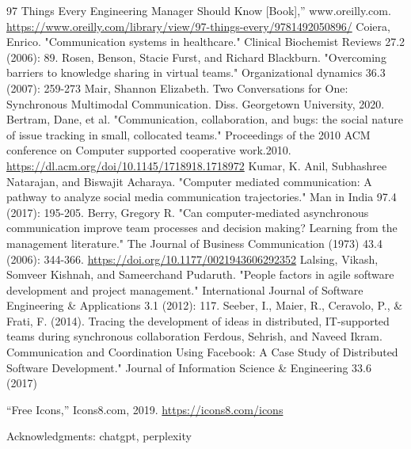 \documentclass[runningheads]{llncs}
\begin{document}
    \begin{thebibliography}{8}
    97 Things Every Engineering Manager Should Know [Book],” www.oreilly.com.
    \url{https://www.oreilly.com/library/view/97-things-every/9781492050896/}
    ‌
    Coiera, Enrico. "Communication systems in healthcare." Clinical Biochemist Reviews 27.2 (2006): 89.
    Rosen, Benson, Stacie Furst, and Richard Blackburn. "Overcoming barriers to knowledge sharing in virtual teams." Organizational dynamics 36.3 (2007): 259-273
    Mair, Shannon Elizabeth. Two Conversations for One: Synchronous Multimodal Communication. Diss. Georgetown University, 2020.
    Bertram, Dane, et al. "Communication, collaboration, and bugs: the social nature of issue tracking in small, collocated teams." Proceedings of the 2010 ACM conference on Computer supported cooperative work.2010. \url{https://dl.acm.org/doi/10.1145/1718918.1718972}
    Kumar, K. Anil, Subhashree Natarajan, and Biswajit Acharaya. "Computer mediated communication: A pathway to analyze social media communication trajectories." Man in India 97.4 (2017): 195-205.
    Berry, Gregory R. "Can computer-mediated asynchronous communication improve team processes and decision making? Learning from the management literature." The Journal of Business Communication (1973) 43.4 (2006): 344-366. \url{https://doi.org/10.1177/0021943606292352}
    Lalsing, Vikash, Somveer Kishnah, and Sameerchand Pudaruth. "People factors in agile software development and project management." International Journal of Software Engineering \& Applications 3.1 (2012): 117.
    Seeber, I., Maier, R., Ceravolo, P., \& Frati, F. (2014). Tracing the development of ideas in distributed, IT-supported teams during synchronous collaboration
    Ferdous, Sehrish, and Naveed Ikram. Communication and Coordination Using Facebook: A Case Study of Distributed Software Development." Journal of Information Science \& Engineering 33.6 (2017)
    
    “Free Icons,” Icons8.com, 2019. \url{https://icons8.com/icons}

    Acknowledgments: chatgpt, perplexity
    \end{thebibliography}
    
\end{document}
